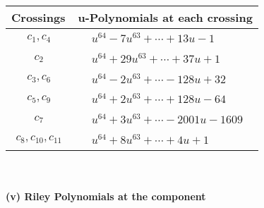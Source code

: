 \documentclass[1p]{elsarticle_modified}
\theoremstyle{definition}
\begin{document}
\begin{tabular}{m{50pt}|m{274pt}}
Crossings & \hspace{64pt}u-Polynomials at each crossing \\
\hline $$\begin{aligned}c_{1},c_{4}\end{aligned}$$&$\begin{aligned}
&u^{64}-7 u^{63}+\cdots+13 u-1
\end{aligned}$\\
\hline $$\begin{aligned}c_{2}\end{aligned}$$&$\begin{aligned}
&u^{64}+29 u^{63}+\cdots+37 u+1
\end{aligned}$\\
\hline $$\begin{aligned}c_{3},c_{6}\end{aligned}$$&$\begin{aligned}
&u^{64}-2 u^{63}+\cdots-128 u+32
\end{aligned}$\\
\hline $$\begin{aligned}c_{5},c_{9}\end{aligned}$$&$\begin{aligned}
&u^{64}+2 u^{63}+\cdots+128 u-64
\end{aligned}$\\
\hline $$\begin{aligned}c_{7}\end{aligned}$$&$\begin{aligned}
&u^{64}+3 u^{63}+\cdots-2001 u-1609
\end{aligned}$\\
\hline $$\begin{aligned}c_{8},c_{10},c_{11}\end{aligned}$$&$\begin{aligned}
&u^{64}+8 u^{63}+\cdots+4 u+1
\end{aligned}$\\
\hline
\end{tabular}\\~\\
\newpage\renewcommand{\arraystretch}{1}
\flushleft \textbf{(v) Riley Polynomials at the component}\newline \\
\end{document}
